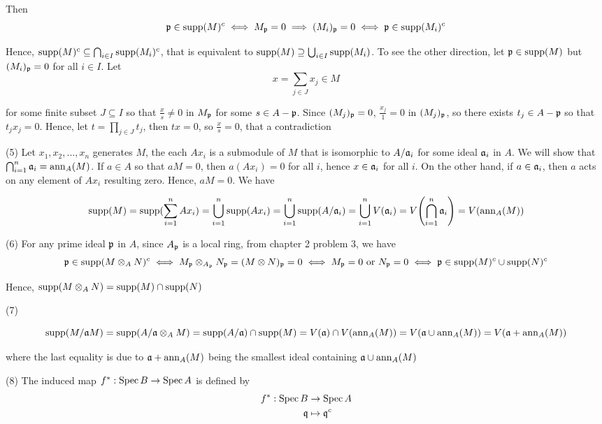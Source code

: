 \begin{longproof}
	Then
	$$
		\mathfrak{p} \in \operatorname{supp}(M)^c \iff M_{\mathfrak{p}} = 0 \implies (M_i)_{\mathfrak{p}} = 0 \iff \mathfrak{p} \in \operatorname{supp}(M_i)^c
	$$
	
	Hence, $\operatorname{supp}(M)^c \subseteq  \bigcap_{i \in I} \operatorname{supp}(M_i)^c$, that is equivalent to $\operatorname{supp}(M) \supseteq \bigcup_{i \in I} \operatorname{supp}(M_i)$. To see the other direction, let $\mathfrak{p} \in \operatorname{supp}(M)$ but $(M_i)_{\mathfrak{p}} = 0$ for all $i \in I$. Let 
	$$
		x = \sum_{j \in J} x_j \in M
	$$
	
	for some finite subset $J \subseteq I$ so that $\frac{x}{s} \neq 0$ in $M_{\mathfrak{p}}$ for some $s \in A - \mathfrak{p}$. Since $(M_j)_{\mathfrak{p}} = 0$, $\frac{x_j}{1} = 0$ in $(M_j)_{\mathfrak{p}}$, so there exists $t_j \in A - \mathfrak{p}$ so that $t_j x_j = 0$. Hence, let $t = \prod_{j \in J} t_j$, then $tx = 0$, so $\frac{x}{s} = 0$, that a contradiction
		
	(5)	Let $x_1, x_2, ..., x_n$ generates $M$, the each $A x_i$ is a submodule of $M$ that is isomorphic to $A / \mathfrak{a}_i$ for some ideal $\mathfrak{a}_i$ in $A$. We will show that $\bigcap_{i=1}^n \mathfrak{a}_i = \operatorname{ann}_A(M)$. If $a \in A$ so that $aM = 0$, then $a(A x_i) = 0$ for all $i$, hence $x \in \mathfrak{a}_i$ for all $i$. On the other hand, if $a \in \mathfrak{a}_i$, then $a$ acts on any element of $Ax_i$ resulting zero. Hence, $aM = 0$. We have
	
	$$
		\supp(M) = \supp(\sum_{i=1}^n Ax_i) = \bigcup_{i=1}^n \supp(A x_i) = \bigcup_{i=1}^n \supp(A / \mf{a}_i) = \bigcup_{i=1}^n V(\mf{a}_i) = V\tuple*{\bigcap_{i=1}^n \mf{a}_i} = V(\ann_A(M))
	$$
	
	
	
	(6) For any prime ideal $\mathfrak{p}$ in $A$, since $A_{\mathfrak{p}}$ is a local ring, from chapter 2 problem 3, we have
	$$
		\mathfrak{p} \in \operatorname{supp}(M \otimes_A N)^c \iff M_{\mathfrak{p}} \otimes_{A_{\mathfrak{p}}} N_{\mathfrak{p}} = (M \otimes N)_{\mathfrak{p}} = 0 \iff M_{\mathfrak{p}} = 0 \text{ or } N_{\mathfrak{p}} = 0 \iff \mathfrak{p} \in \operatorname{supp}(M)^c \cup \operatorname{supp}(N)^c
	$$
	
	Hence, $\operatorname{supp}(M \otimes_A N) = \operatorname{supp}(M) \cap \operatorname{supp}(N)$
	
	(7) 
	
	$$
		\operatorname{supp}(M / \mathfrak{a} M) = \operatorname{supp}(A / \mathfrak{a} \otimes_A M) = \operatorname{supp}(A / \mathfrak{a}) \cap \operatorname{supp}(M) = V(\mathfrak{a}) \cap V(\operatorname{ann}_A(M)) = V(\mathfrak{a} \cup \operatorname{ann}_A(M)) = V(\mathfrak{a} + \operatorname{ann}_A(M))
	$$
	
	where the last equality is due to $\mathfrak{a} + \operatorname{ann}_A(M)$ being the smallest ideal containing $\mathfrak{a} \cup \operatorname{ann}_A(M)$
	
	(8) The induced map $f^*: \operatorname{Spec} B \to \operatorname{Spec} A$ is defined by
	\begin{align*}
		f^*: \operatorname{Spec} B &\to \operatorname{Spec} A \\
				\mathfrak{q} &\mapsto \mathfrak{q}^c
	\end{align*}
	

\end{longproof}
